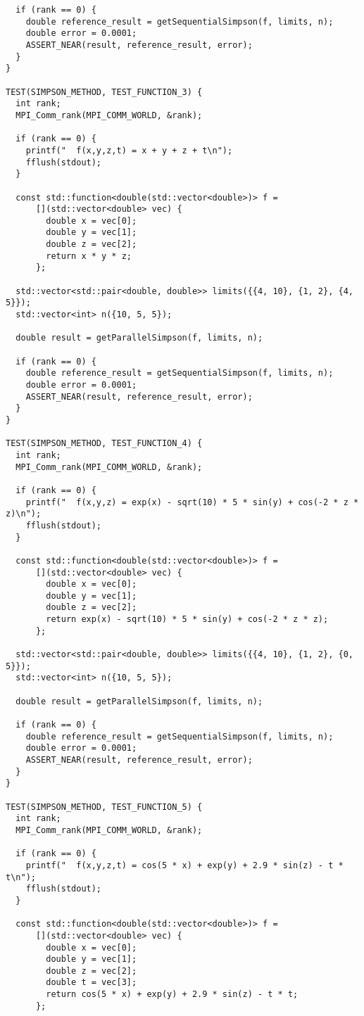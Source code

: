 \documentclass{report}
\begin{document}
\begin{lstlisting}
  if (rank == 0) {
    double reference_result = getSequentialSimpson(f, limits, n);
    double error = 0.0001;
    ASSERT_NEAR(result, reference_result, error);
  }
}

TEST(SIMPSON_METHOD, TEST_FUNCTION_3) {
  int rank;
  MPI_Comm_rank(MPI_COMM_WORLD, &rank);

  if (rank == 0) {
    printf("  f(x,y,z,t) = x + y + z + t\n");
    fflush(stdout);
  }

  const std::function<double(std::vector<double>)> f =
      [](std::vector<double> vec) {
        double x = vec[0];
        double y = vec[1];
        double z = vec[2];
        return x * y * z;
      };

  std::vector<std::pair<double, double>> limits({{4, 10}, {1, 2}, {4, 5}});
  std::vector<int> n({10, 5, 5});

  double result = getParallelSimpson(f, limits, n);

  if (rank == 0) {
    double reference_result = getSequentialSimpson(f, limits, n);
    double error = 0.0001;
    ASSERT_NEAR(result, reference_result, error);
  }
}

TEST(SIMPSON_METHOD, TEST_FUNCTION_4) {
  int rank;
  MPI_Comm_rank(MPI_COMM_WORLD, &rank);

  if (rank == 0) {
    printf("  f(x,y,z) = exp(x) - sqrt(10) * 5 * sin(y) + cos(-2 * z * z)\n");
    fflush(stdout);
  }

  const std::function<double(std::vector<double>)> f =
      [](std::vector<double> vec) {
        double x = vec[0];
        double y = vec[1];
        double z = vec[2];
        return exp(x) - sqrt(10) * 5 * sin(y) + cos(-2 * z * z);
      };

  std::vector<std::pair<double, double>> limits({{4, 10}, {1, 2}, {0, 5}});
  std::vector<int> n({10, 5, 5});

  double result = getParallelSimpson(f, limits, n);

  if (rank == 0) {
    double reference_result = getSequentialSimpson(f, limits, n);
    double error = 0.0001;
    ASSERT_NEAR(result, reference_result, error);
  }
}

TEST(SIMPSON_METHOD, TEST_FUNCTION_5) {
  int rank;
  MPI_Comm_rank(MPI_COMM_WORLD, &rank);

  if (rank == 0) {
    printf("  f(x,y,z,t) = cos(5 * x) + exp(y) + 2.9 * sin(z) - t * t\n");
    fflush(stdout);
  }

  const std::function<double(std::vector<double>)> f =
      [](std::vector<double> vec) {
        double x = vec[0];
        double y = vec[1];
        double z = vec[2];
        double t = vec[3];
        return cos(5 * x) + exp(y) + 2.9 * sin(z) - t * t;
      };


\end{lstlisting}
\end{document}
